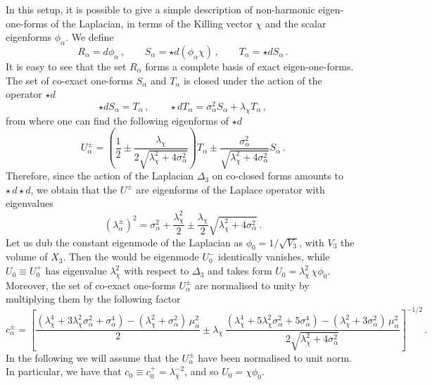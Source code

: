 \documentclass[11pt]{article}
\def\a {\alpha}
\begin{document}
In this setup, it is possible to give a simple description of non-harmonic eigen-one-forms of the Laplacian, in terms of the Killing vector $\chi$ and the scalar eigenforms $\phi_\a$. We define 
\begin{equation}
	R_\a = d \phi_\a \,, \qquad S_\a = \star d (\phi_\a \chi ) \,, \qquad T_\a = \star d S_\a \,. \label{eq: BandC}
\end{equation}
It is easy to see that the set $R_\a$ forms a complete basis of exact eigen-one-forms. The set of co-exact one-forms $S_\a$ and $T_\a$ is closed under the action of the operator $ \star d$
\begin{equation}
	\star d S_\a = T_\a \,, \qquad \star d T_\a = \sigma_\a^2 S_\a +  \lambda_\chi T_\a\, ,
\end{equation}
from where one can find the following eigenforms of $\star d$
\begin{equation}
	U^\pm_\a = \left(\frac{1}{2}\pm\frac{ \lambda_\chi}{2 \sqrt{ \lambda_\chi^2 + 4 \sigma_\a^2}}\right) T_\a \pm \frac{\sigma_\a^2}{\sqrt{ \lambda_\chi^2 + 4 \sigma_\a^2}}S_\a \,.  \label{eq: Dpm}
\end{equation}
Therefore, since the action of the Laplacian $\Delta_3$ on co-closed forms amounts to $\star \, d \star d$, we obtain that the $U^\pm$ are eigenforms of the Laplace operator with eigenvalues
\begin{equation}
	(\lambda^\pm_\a)^2 = \sigma_\a^2 + \frac{ \lambda_\chi^2}{2} \pm \frac{ \lambda_\chi}{2}\sqrt{ \lambda_\chi^2 + 4 \sigma_\a^2 } \,.\label{eq: lambdapm}
\end{equation} 
Let us dub the constant eigenmode of the Laplacian as $\phi_0 = 1/\sqrt{V_3}$, with $V_3$ the volume of $X_3$. Then the would be eigenmode $U_0^-$ identically vanishes, while $U_0 \equiv U_0^+$ has eigenvalue $ \lambda_\chi^2$  with respect to $\Delta_3$ and takes form $U_0 =  \lambda_\chi^2 \, \chi \phi_0$. Moreover, the set of co-exact one-forms $U^\pm_\a $ are normalised to unity by multiplying them by the following factor 
\begin{equation}
c_\a^{\pm} = \left[\frac{( \lambda_\chi^4+3 \lambda_\chi^2 \sigma_\a^2+\sigma_\a^4) - ( \lambda_\chi^2+\sigma_\a^2)\,\mu_\a^2}{2} \pm   \lambda_\chi \, \frac{( \lambda_\chi^4 + 5 \lambda_\chi^2 \sigma_\a^2 + 5\sigma_\a^4)-( \lambda_\chi^2+3\sigma_\a^2)\,\mu_\a^2}{2 \sqrt{ \lambda_\chi^2 + 4 \sigma_\a^2}}\right]^{-1/2}\,.
\end{equation}
In the following we will assume that the $U_\a^{\pm}$ have been normalised to unit norm. In particular, we have that $c_0 \equiv c_0^+ =  \lambda_\chi^{-2}$, and so $U_0 = \chi \phi_0$. 
\end{document}
